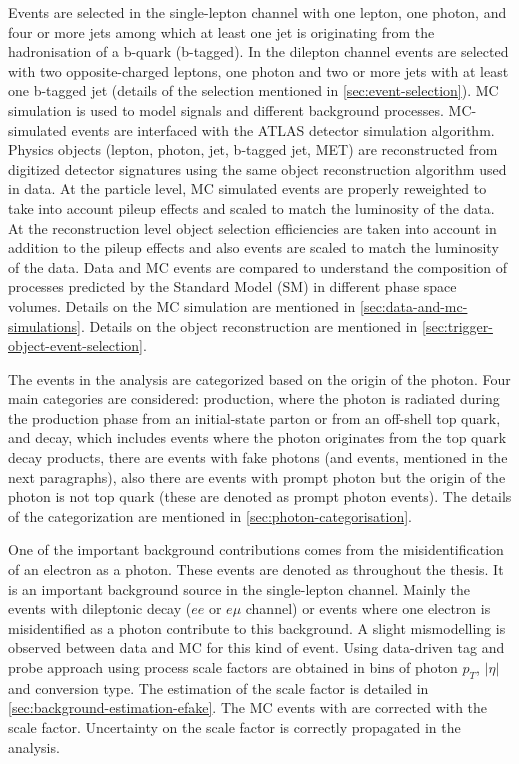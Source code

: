 Events are selected in the single-lepton channel with one lepton, one photon, and four or more jets among which at least one jet is originating from the hadronisation of a b-quark (b-tagged). In the dilepton channel events are selected with two opposite-charged leptons, one photon and two or more jets with at least one b-tagged jet (details of the selection mentioned in \cref{sec:event-selection}). MC simulation is used to model signals and different background processes. MC-simulated events are interfaced with the ATLAS detector simulation algorithm. Physics objects (lepton, photon, jet, b-tagged jet, MET) are reconstructed from digitized detector signatures using the same object reconstruction algorithm used in data. At the particle level, MC simulated events are properly reweighted to take into account pileup effects and scaled to match the luminosity of the data. At the reconstruction level object selection efficiencies are taken into account in addition to the pileup effects and also events are scaled to match the luminosity of the data. Data and MC events are compared to understand the composition of processes predicted by the Standard Model (SM) in different phase space volumes. Details on the MC simulation are mentioned in \cref{sec:data-and-mc-simulations}. Details on the object reconstruction are mentioned in \cref{sec:trigger-object-event-selection}.


The events in the analysis are categorized based on the origin of the photon. Four main categories are considered: \tty production, where the photon is radiated during the production phase from an initial-state parton or from an off-shell top quark, and \tty decay, which includes events where the photon originates from the top quark decay products, there are events with fake photons (\efake and \hfake events, mentioned in the next paragraphs), also there are events with prompt photon but the origin of the photon is not top quark (these are denoted as prompt photon events). The details of the categorization are mentioned in \cref{sec:photon-categorisation}.

One of the important background contributions comes from the misidentification of an electron as a photon. These events are denoted as \efake throughout the thesis. It is an important background source in the single-lepton channel. Mainly the \ttbar events with dileptonic decay ($ee$ or $e\mu$ channel) or \zee events where one electron is misidentified as a photon contribute to this background. A slight mismodelling is observed between data and MC for this kind of event. Using data-driven tag and probe approach using \zee process scale factors are obtained in bins of photon $p_T$, $|\eta|$ and conversion type. The estimation of the scale factor is detailed in \cref{sec:background-estimation-efake}. The MC events with \efake are corrected with the scale factor. Uncertainty on the scale factor is correctly propagated in the analysis.

